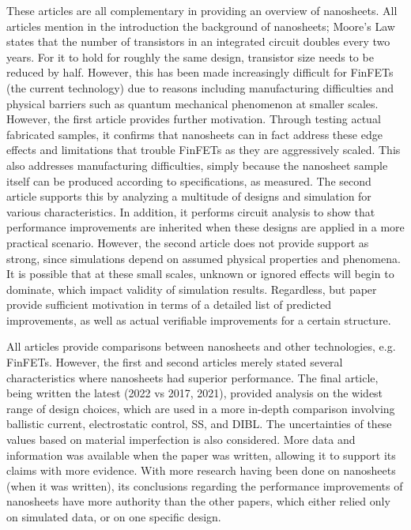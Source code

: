 \documentclass[12pt]{article}
\begin{document}
These articles are all complementary in providing an overview of nanosheets. All articles mention in the introduction the background of nanosheets; Moore's Law~\cite{moore} states that the number of transistors in an integrated circuit doubles every two years. For it to hold for roughly the same design, transistor size needs to be reduced by half. However, this has been made increasingly difficult for FinFETs (the current technology) due to reasons including manufacturing difficulties and physical barriers such as quantum mechanical phenomenon at smaller scales. However, the first article provides further motivation. Through testing actual fabricated samples, it confirms that nanosheets can in fact address these edge effects and limitations that trouble FinFETs as they are aggressively scaled. This also addresses manufacturing difficulties, simply because the nanosheet sample itself can be produced according to specifications, as measured. The second article supports this by analyzing a multitude of designs and simulation for various characteristics. In addition, it performs circuit analysis to show that performance improvements are inherited when these designs are applied in a more practical scenario. However, the second article does not provide support as strong, since simulations depend on assumed physical properties and phenomena. It is possible that at these small scales, unknown or ignored effects will begin to dominate, which impact validity of simulation results. Regardless, but paper provide sufficient motivation in terms of a detailed list of predicted improvements, as well as actual verifiable improvements for a certain structure.

All articles provide comparisons between nanosheets and other technologies, e.g. FinFETs. However, the first and second articles merely stated several characteristics where nanosheets had superior performance. The final article, being written the latest (2022 vs 2017, 2021), provided analysis on the widest range of design choices, which are used in a more in-depth comparison involving ballistic current, electrostatic control, SS, and DIBL. The uncertainties of these values based on material imperfection is also considered. More data and information was available when the paper was written, allowing it to support its claims with more evidence. With more research having been done on nanosheets (when it was written), its conclusions regarding the performance improvements of nanosheets have more authority than the other papers, which either relied only on simulated data, or on one specific design.
\end{document}
